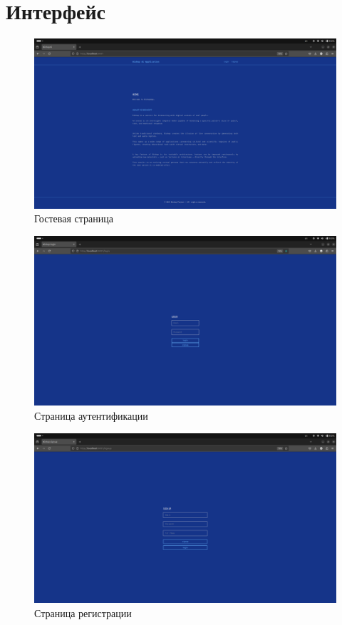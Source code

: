 \chapter{Интерфейс}\label{app:A}
\begin{figure}[h!]
    \centering
    \includegraphics[width=1.0\linewidth]{images/ui/welcome.png}
    \caption{Гостевая страница}
    \label{fig:ui-page-welcome}
\end{figure}

\begin{figure}
    \centering
    \includegraphics[width=1.0\linewidth]{images/ui/login.png}
    \caption{Страница аутентификации}
    \label{fig:ui-page-login}
\end{figure}

\begin{figure}
    \centering
    \includegraphics[width=1.0\linewidth]{images/ui/signup.png}
    \caption{Страница регистрации}
    \label{fig:ui-page-signup}
\end{figure}

